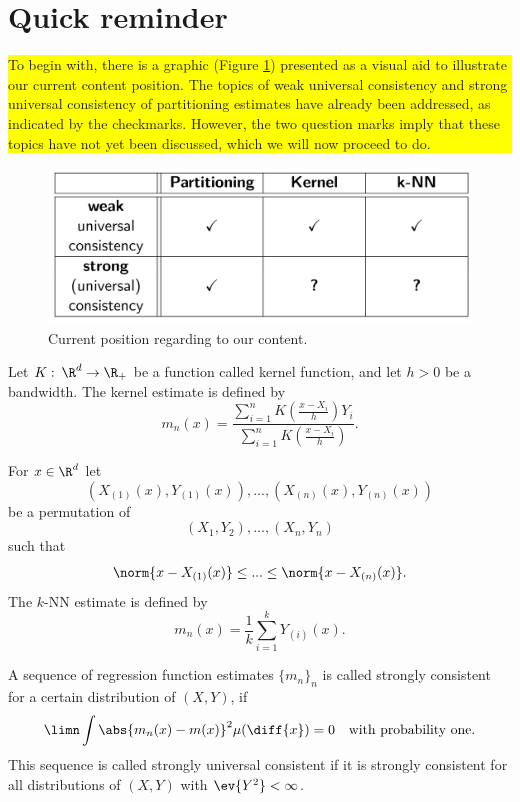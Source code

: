 \tableofcontents

\newpage

\section{Quick reminder}

\colorbox{yellow}{\parbox{10cm}{To begin with, there is a graphic (Figure \ref{wherearewe}) presented as a visual aid to illustrate our current content position. The topics of weak universal consistency and strong universal consistency of partitioning estimates have already been addressed, as indicated by the checkmarks. However, the two question marks imply that these topics have not yet been discussed, which we will now proceed to do.}}
\begin{figure}[h] \label{wherearewe}
    \includegraphics[scale=0.12]{wherearewe.jpeg}
    \centering
    \caption{Current position regarding to our content.}
\end{figure}


\begin{definition}
    Let $K: \: \R^d \to \R_{+}$ be a function called kernel function, and let $h>0$ be a bandwidth. The kernel estimate is defined by
    \[m_n(x) = \frac{\sum_{i=1}^nK(\frac{x-X_i}{h})Y_i}{\sum_{i=1}^nK(\frac{x-X_i}{h})}.\]
\end{definition}

\begin{definition}[$k$-NN estimate]
    For $x \in \R^d$ let
    \[(X_{(1)}(x),Y_{(1)}(x)),...,(X_{(n)}(x),Y_{(n)}(x))\]
    be a permutation of
    \[(X_1,Y_2),...,(X_n,Y_n)\]
    such that
    \[\norm{x-X_{(1)}(x)} \leq ... \leq \norm{x-X_{(n)}(x)}.\]
    The $k$-NN estimate is defined by
    \[m_n(x) = \frac{1}{k} \sum_{i=1}^kY_{(i)}(x).\]
\end{definition}

\begin{definition}
    A sequence of regression function estimates $\{m_n\}_n$ is called strongly consistent for a certain distribution of $(X,Y)$, if
    \[\limn \int \abs{m_n(x) - m(x)}^2 \mu(\diff{x}) = 0 \quad\text{with probability one.}\]
    This sequence is called strongly universal consistent if it is strongly consistent for all distributions of $(X,Y)$ with $\ev{Y^2}<\infty$.
\end{definition}

